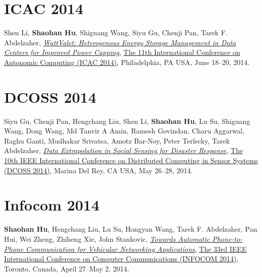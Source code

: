\section{\sc ICAC 2014}\hypertarget{li2014icac}{}
Shen Li, \textbf{Shaohan Hu}, Shiguang Wang, Siyu Gu, Chenji Pan, Tarek F. Abdelzaher,
\href{https://www.usenix.org/system/files/conference/icac14/icac14-paper-li_shen.pdf}{\emph{WattValet: Heterogenous Energy Storage Management in Data Centers for Improved Power Capping}},
\href{https://www.usenix.org/conference/icac14}{\textsf{The 11th International Conference on Autonomic Computing (ICAC 2014)}},
Philadelphia, PA USA, June 18--20, 2014.

\section{\sc DCOSS 2014}\hypertarget{gu2014dcoss}{}
Siyu Gu, Chenji Pan, Hengchang Liu, Shen Li, \textbf{Shaohan Hu}, Lu Su, Shiguang Wang, Dong Wang, Md Tanvir A Amin, Ramesh Govindan, Charu Aggarwal, Raghu Ganti, Mudhakar Srivatsa, Amotz Bar-Noy, Peter Terlecky, Tarek Abdelzaher,
\href{http://ieeexplore.ieee.org/xpl/articleDetails.jsp?arnumber=6846153}{\emph{Data Extrapolation in Social Sensing for Disaster Response}},
\href{http://www.dcoss.org/dcoss14/}{\textsf{The 10th IEEE International Conference on Distributed Computing in Sensor Systems (DCOSS 2014)}},
Marina Del Rey, CA USA, May 26--28, 2014.


\section{\sc Infocom 2014}\hypertarget{hu2014infocom}{}
\textbf{Shaohan Hu}, Hengchang Liu, Lu Su, Hongyan Wang, Tarek F. Abdelzaher, Pan Hui, Wei Zheng, Zhiheng Xie, John Stankovic,
\href{http://ieeexplore.ieee.org/xpl/articleDetails.jsp?arnumber=6848113}{\emph{Towards Automatic Phone-to-Phone Communication for Vehicular Networking Applications}},
\href{http://infocom2014.ieee-infocom.org}{\textsf{The 33rd IEEE International Conference on Computer Communications (INFOCOM 2014)}},
Toronto, Canada, April 27--May 2, 2014.

